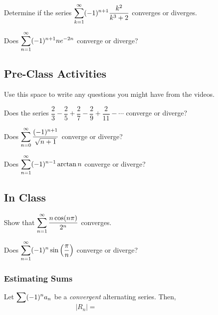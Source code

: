 \documentclass[notes]{subfiles}
\begin{document}
		\begin{ex}
			Determine if the series $\displaystyle \sum_{k=1}^\infty (-1)^{n+1} \dfrac{k^2}{k^3 + 2}$ converges or diverges.
		\end{ex}
			
		\begin{ex}
			Does $\displaystyle\sum_{n=1}^\infty (-1)^{n+1}ne^{-2n}$ converge or diverge?
		\end{ex}
			\newpage
			
	\subsection*{Pre-Class Activities}
		\begin{ex}
			Use this space to write any questions you might have from the videos.
		\end{ex}
			
		\begin{ex}
			Does the series $\dfrac{2}{3} - \dfrac{2}{5} + \dfrac{2}{7} - \dfrac{2}{9} + \dfrac{2}{11} - \cdots$ converge or diverge?
		\end{ex}
			
		\begin{ex}
			Does $\displaystyle \sum_{n=0}^\infty \dfrac{(-1)^{n+1}}{\sqrt{n+1}}$ converge or diverge?
		\end{ex}
			
		\begin{ex}
			Does $\displaystyle \sum_{n=1}^\infty (-1)^{n-1}\arctan n$ converge or diverge?
		\end{ex}
			\newpage
			
	\subsection*{In Class}
		\begin{ex}
			Show that $\displaystyle \sum_{n=1}^\infty \dfrac{n\cos (n\pi)}{2^n}$ converges.  
		\end{ex}
			
		\begin{ex}
			Does $\displaystyle \sum_{n=1}^\infty (-1)^n \sin \left( \dfrac{\pi}{n}\right)$ converge or diverge?
		\end{ex}
			
	\subsubsection*{Estimating Sums}
		\begin{rmk}
			Let $\displaystyle \sum (-1)^na_n$ be a \emph{convergent} alternating series.  Then,
				\[|R_n| = \hspace{2in}\]
		\end{rmk}
			\newpage
			
\end{document}
